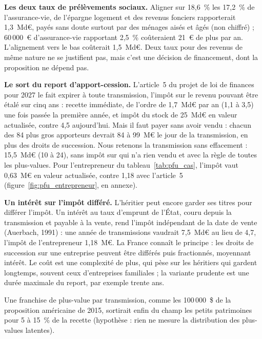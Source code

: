 \documentclass[11pt,a4paper]{article}
\begin{document}
\textbf{Les deux taux de prélèvements sociaux.} Aligner sur 18,6~\% les 17,2~\% de l'assurance-vie, de l'épargne
logement et des revenus fonciers rapporterait 1,3~Md€, payés sans doute surtout par des ménages aisés et âgés (non
chiffré) ; 60\,000~€ d'assurance-vie rapportant 2,5~\% coûteraient 21~€ de plus par an. L'alignement vers le bas
coûterait 1,5~Md€. Deux taux pour des revenus de même nature ne se justifient pas, mais c'est une décision de
financement, dont la proposition ne dépend pas.

\textbf{Le sort du report d'apport-cession.} L'article~5 du projet de loi de finances pour 2027 le fait expirer à
toute transmission, l'impôt sur le revenu pouvant être étalé sur cinq ans : recette immédiate, de l'ordre de
1,7~Md€ par an (1,1 à 3,5) une fois passée la première année, et impôt du stock de 25~Md€ en valeur actualisée,
contre 4,5 aujourd'hui. Mais il faut payer sans avoir vendu : chacun des 84 plus gros apporteurs devrait 84 à
99~M€ le jour de la transmission, en plus des droits de succession. Nous retenons la transmission sans effacement :
15,5~Md€ (10 à 24), sans impôt sur qui n'a rien vendu et avec la règle de toutes les plus-values. Pour
l'entrepreneur du tableau~\ref{tab:pfu_cas}, l'impôt vaut 0,63~M€ en valeur actualisée, contre 1,18 avec
l'article~5 (figure~\ref{fig:pfu_entrepreneur}, en annexe).

\textbf{Un intérêt sur l'impôt différé.} L'héritier peut encore garder ses titres pour différer l'impôt. Un intérêt
au taux d'emprunt de l'État, couru depuis la transmission et payable à la vente, rend l'impôt indépendant de la date
de vente (Auerbach, 1991) : une année de transmissions vaudrait 7,5~Md€ au lieu de 4,7, l'impôt de l'entrepreneur
1,18~M€. La France connaît le principe : les droits de succession sur une entreprise peuvent être différés puis
fractionnés, moyennant intérêt. Le coût est une complexité de plus, qui pèse sur les héritiers qui gardent
longtemps, souvent ceux d'entreprises familiales ; la variante prudente est une durée maximale du report, par
exemple trente ans.

Une franchise de plus-value par transmission, comme les 100\,000~\$ de la proposition américaine de 2015, sortirait
enfin du champ les petits patrimoines pour 5 à 15~\% de la recette (hypothèse : rien ne mesure la distribution des
plus-values latentes).
\end{document}
